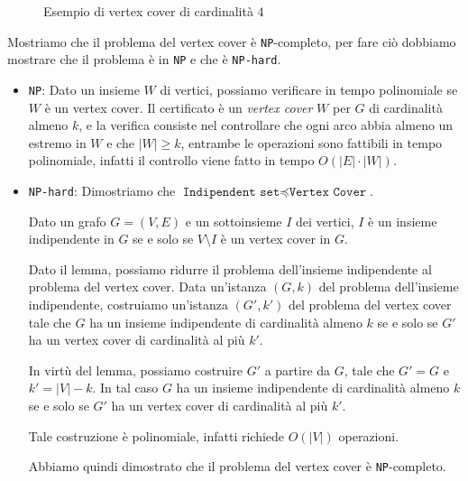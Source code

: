 \begin{figure}[H]
    \centering 
    \caption{Esempio di vertex cover di cardinalità $4$}
\end{figure}

Mostriamo che il problema del vertex cover è \texttt{NP}-completo, per fare ciò
dobbiamo mostrare che il problema è in \texttt{NP} e che è \texttt{NP-hard}.

\begin{itemize}
    \item \texttt{NP}: Dato un insieme $W$ di vertici, possiamo verificare in tempo polinomiale
    se $W$ è un vertex cover. Il certificato è un \textit{vertex cover} $W$ per $G$ di cardinalità
    almeno $k$, e la verifica consiste nel controllare che ogni arco abbia almeno un estremo in $W$
    e che $|W| \geq k$, entrambe le operazioni sono fattibili in tempo polinomiale, infatti il controllo
    viene fatto in tempo $O(|E| \cdot |W|)$.
    \item \texttt{NP-hard}: Dimostriamo che $\texttt{Indipendent set} \preceq  \texttt{Vertex Cover}$.

\begin{lemma}
    Dato un grafo $G = (V,E)$ e un sottoinsieme $I$ dei vertici, $I$ è un insieme indipendente
    in $G$ se e solo se $V \setminus I$ è un vertex cover in $G$.
\end{lemma}
    Dato il lemma, possiamo ridurre il problema dell'insieme indipendente al
    problema del vertex cover. Data un'istanza $(G, k)$ del problema dell'insieme indipendente,
    costruiamo un'istanza $(G', k')$ del problema del vertex cover tale che $G$ ha un insieme 
    indipendente di cardinalità almeno $k$ se e solo se $G'$ ha un vertex cover di cardinalità
    al più $k'$.

    In virtù del lemma, possiamo costruire $G'$ a partire da $G$, tale che $G' = G$ e $k' = |V| - k$.
    In tal caso $G$ ha un insieme indipendente di cardinalità almeno $k$ se e solo se $G'$ ha un
    vertex cover di cardinalità al più $k'$.

    Tale costruzione è polinomiale, infatti richiede $O(|V|)$ operazioni.

    Abbiamo quindi dimostrato che il problema del vertex cover è \texttt{NP}-completo.
\end{itemize}

